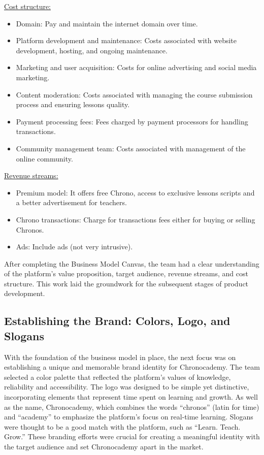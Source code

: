 \underline{Cost structure:}
\begin{itemize}
\item Domain: Pay and maintain the internet domain over time.
\item Platform development and maintenance: Costs associated with website development, hosting, and ongoing maintenance.
\item Marketing and user acquisition: Costs for online advertising and social media marketing.
\item Content moderation: Costs associated with managing the course submission process and ensuring lessons quality.
\item Payment processing fees: Fees charged by payment processors for handling transactions.
\item Community management team: Costs associated with management of the online community.
\end{itemize}

\underline{Revenue streams:}
\begin{itemize}
\item Premium model: It offers free Chrono, access to exclusive lessons scripts and a better advertisement for teachers.
\item Chrono transactions: Charge for transactions fees either for buying or selling Chronos.
\item Ads: Include ads (not very intrusive).
\end{itemize}

After completing the Business Model Canvas, the team had a clear understanding of the platform's value proposition, target audience, revenue streams, and cost structure.
This work laid the groundwork for the subsequent stages of product development.

\subsection{Establishing the Brand: Colors, Logo, and Slogans}\label{subsec:colors-logo-slogans}
With the foundation of the business model in place, the next focus was on establishing a unique and memorable brand identity for Chronocademy.
The team selected a color palette that reflected the platform’s values of knowledge, reliability and accessibility.
The logo was designed to be simple yet distinctive, incorporating elements that represent time spent on learning and growth.
As well as the name, Chronocademy, which combines the words ``chronos'' (latin for time) and ``academy'' to emphasize the platform's focus on real-time learning.
Slogans were thought to be a good match with the platform, such as ``Learn.
Teach.
Grow.'' These branding efforts were crucial for creating a meaningful identity with the target audience and set Chronocademy apart in the market.

